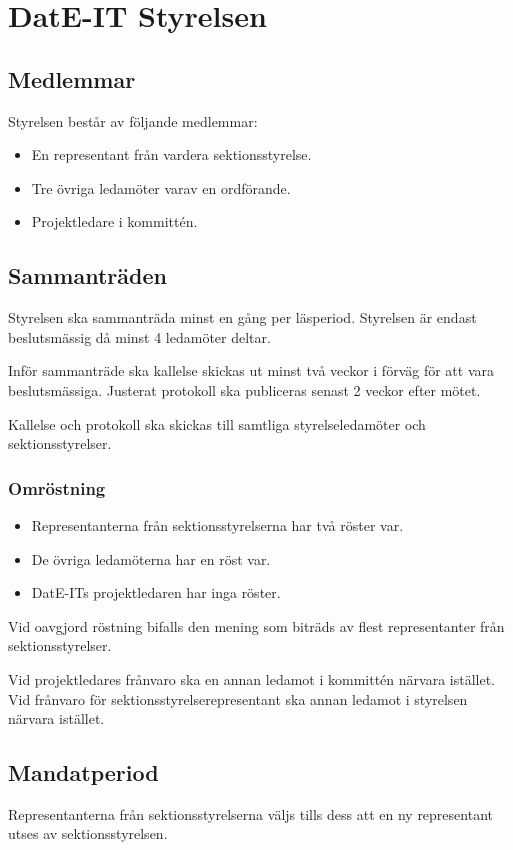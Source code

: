 \documentclass{article}
\begin{document}
\section{DatE-IT Styrelsen}
\subsection{Medlemmar}
Styrelsen består av följande medlemmar:
\begin{itemize}
    \item En representant från vardera sektionsstyrelse.
    \item Tre övriga ledamöter varav en ordförande.
    \item Projektledare i kommittén.
\end{itemize}

\subsection{Sammanträden}
Styrelsen ska sammanträda minst en gång per läsperiod. Styrelsen är endast beslutsmässig då minst 4 ledamöter deltar.

Inför sammanträde ska kallelse skickas ut minst två veckor i förväg för att vara beslutsmässiga. Justerat protokoll ska publiceras senast 2 veckor efter mötet.

Kallelse och protokoll ska skickas till samtliga styrelseledamöter och sektionsstyrelser.

\subsubsection{Omröstning}
\begin{itemize}
    \item Representanterna från sektionsstyrelserna har två röster var.
    \item De övriga ledamöterna har en röst var.
    \item DatE-ITs projektledaren har inga röster.
\end{itemize}

Vid oavgjord röstning bifalls den mening som biträds av flest representanter från sektionsstyrelser.

Vid projektledares frånvaro ska en annan ledamot i kommittén närvara istället. Vid frånvaro för sektionsstyrelserepresentant ska annan ledamot i styrelsen närvara istället. 

\subsection{Mandatperiod}
Representanterna från sektionsstyrelserna väljs tills dess att en ny representant utses av sektionsstyrelsen.
\end{document}
